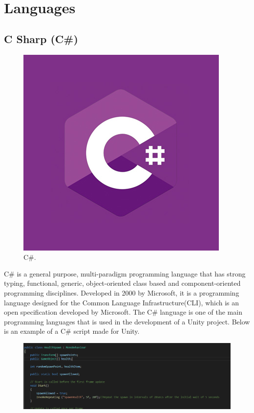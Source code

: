 \section{Languages}

\subsection{C Sharp (C\#)}

\begin{figure}[h]
  \includegraphics[scale=.5]{Images/C-sharp-logo.jpg}
  \caption{C\#.}
  \label{fig:C-Sharp}
\end{figure}

C\# is a general purpose, multi-paradigm programming language that has strong typing, functional, generic, object-oriented class based and component-oriented programming disciplines. Developed in 2000 by Microsoft, it is a programming language designed for the Common Language Infrastructure(CLI), which is an open specification developed by Microsoft. The C\# language is one of the main programming languages that is used in the development of a Unity project. Below is an example of a C\# script made for Unity.\cite{CSharp}
\begin{figure}[h]
  \includegraphics[width=\linewidth]{Images/C-Sharp-Example.PNG}
\newpage
  \label{fig:C-Sharp Example}
\end{figure}

